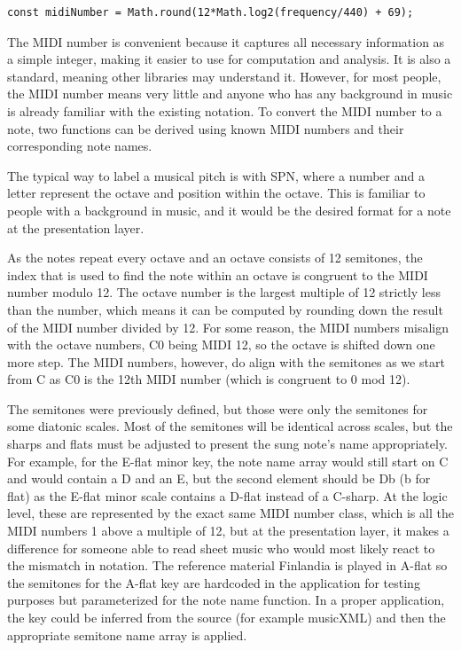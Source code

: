 \begin{lstlisting}[style=javascript, caption={Converting frequency to MIDI number.}]
    const midiNumber = Math.round(12*Math.log2(frequency/440) + 69);
\end{lstlisting}

The MIDI number is convenient because it captures all necessary information as a simple integer, making it easier to use for computation and analysis. It is also a standard, meaning other libraries may understand it. However, for most people, the MIDI number means very little and anyone who has any background in music is already familiar with the existing notation. To convert the MIDI number to a note, two functions can be derived using known MIDI numbers and their corresponding note names. 

The typical way to label a musical pitch is with SPN, where a number and a letter represent the octave and position within the octave. This is familiar to people with a background in music, and it would be the desired format for a note at the presentation layer.

As the notes repeat every octave and an octave consists of 12 semitones, the index that is used to find the note within an octave is congruent to the MIDI number modulo 12. The octave number is the largest multiple of 12 strictly less than the number, which means it can be computed by rounding down the result of the MIDI number divided by 12. For some reason, the MIDI numbers misalign with the octave numbers, C0 being MIDI 12, so the octave is shifted down one more step. The MIDI numbers, however, do align with the semitones as we start from C as C0 is the 12th MIDI number (which is congruent to 0 mod 12).



The semitones were previously defined, but those were only the semitones for some diatonic scales. Most of the semitones will be identical across scales, but the sharps and flats must be adjusted to present the sung note's name appropriately. For example, for the E-flat minor key, the note name array would still start on C and would contain a D and an E, but the second element should be Db (b for flat) as the E-flat minor scale contains a D-flat instead of a C-sharp. At the logic level, these are represented by the exact same MIDI number class, which is all the MIDI numbers 1 above a multiple of 12, but at the presentation layer, it makes a difference for someone able to read sheet music who would most likely react to the mismatch in notation. The reference material Finlandia is played in A-flat so the semitones for the A-flat key are hardcoded in the application for testing purposes but parameterized for the note name function. In a proper application, the key could be inferred from the source (for example musicXML) and then the appropriate semitone name array is applied.

